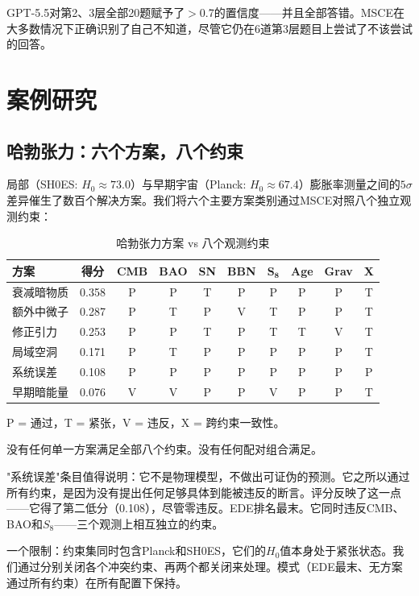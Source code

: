 \documentclass[11pt,a4paper]{ctexart}
\begin{document}
GPT-5.5对第2、3层全部20题赋予了$>$0.7的置信度——并且全部答错。MSCE在大多数情况下正确识别了自己不知道，尽管它仍在6道第3层题目上尝试了不该尝试的回答。

\section{案例研究}

\subsection{哈勃张力：六个方案，八个约束}

局部（SH0ES: $H_0 \approx 73.0$）与早期宇宙（Planck: $H_0 \approx 67.4$）膨胀率测量之间的$5\sigma$差异催生了数百个解决方案。我们将六个主要方案类别通过MSCE对照八个独立观测约束：

\begin{table}[ht]
\centering
\caption{哈勃张力方案 vs 八个观测约束}
{\small
\begin{tabular}{lccccccccc}
\toprule
\textbf{方案} & \textbf{得分} & \textbf{CMB} & \textbf{BAO} & \textbf{SN} & \textbf{BBN} & $\mathbf{S_8}$ & \textbf{Age} & \textbf{Grav} & \textbf{X} \\
\midrule
衰减暗物质 & 0.358 & P & P & T & P & P & P & P & T \\
额外中微子 & 0.287 & P & T & P & V & T & P & P & T \\
修正引力 & 0.253 & P & P & T & P & T & T & V & T \\
局域空洞 & 0.171 & P & T & P & P & P & P & P & T \\
系统误差 & 0.108 & P & P & P & P & P & P & P & P \\
早期暗能量 & 0.076 & V & V & P & P & V & P & P & T \\
\bottomrule
\end{tabular}}
\par\smallskip
P = 通过，T = 紧张，V = 违反，X = 跨约束一致性。
\end{table}

没有任何单一方案满足全部八个约束。没有任何配对组合满足。

"系统误差"条目值得说明：它不是物理模型，不做出可证伪的预测。它之所以通过所有约束，是因为没有提出任何足够具体到能被违反的断言。评分反映了这一点——它得了第二低分（0.108），尽管零违反。EDE排名最末。它同时违反CMB、BAO和$S_8$——三个观测上相互独立的约束。

一个限制：约束集同时包含Planck和SH0ES，它们的$H_0$值本身处于紧张状态。我们通过分别关闭各个冲突约束、再两个都关闭来处理。模式（EDE最末、无方案通过所有约束）在所有配置下保持。
\end{document}
